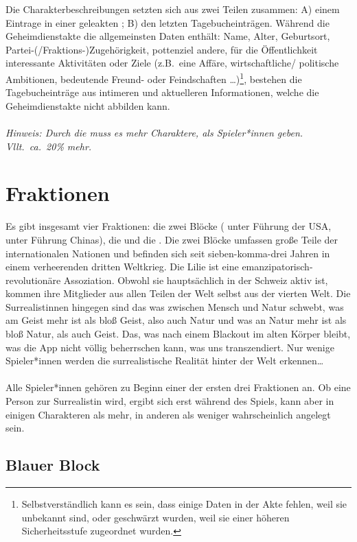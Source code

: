 Die Charakterbeschreibungen setzten sich aus zwei Teilen zusammen: A) einem
Eintrage in einer geleakten ; B) den letzten
Tagebucheinträgen. 
Während die Geheimdienstakte die allgemeinsten Daten enthält: Name, Alter, 
Geburtsort, Partei-(/Fraktions-)Zugehörigkeit, pottenziel andere, für die
Öffentlichkeit interessante Aktivitäten oder Ziele (z.B.~eine Affäre,
wirtschaftliche/ politische Ambitionen, bedeutende Freund- oder Feindschaften
\dots)\footnote{
  Selbstverständlich kann es sein, dass einige Daten in der Akte fehlen, weil
  sie unbekannt sind, oder geschwärzt wurden, weil sie einer höheren
  Sicherheitsstufe zugeordnet wurden.
}, bestehen die Tagebucheinträge aus intimeren und aktuelleren
Informationen, welche die Geheimdienstakte nicht abbilden kann.\\\\
%
\emph{Hinweis: Durch die  muss es mehr Charaktere, als
Spieler*innen geben. Vllt.~ca.~20\% mehr.}

\section{Fraktionen}\label{sec:fraktionen}
Es gibt insgesamt vier Fraktionen: die zwei Blöcke ( unter
Führung der USA,  unter Führung Chinas), die
 und die .
Die zwei Blöcke umfassen große Teile der internationalen Nationen und befinden
sich seit sieben-komma-drei Jahren in einem verheerenden dritten Weltkrieg.
Die Lilie ist eine emanzipatorisch-revolutionäre Assoziation. Obwohl sie
hauptsächlich in der Schweiz aktiv ist, kommen ihre Mitglieder aus allen Teilen
der Welt selbst aus der vierten Welt.
Die Surrealistinnen hingegen sind das was zwischen Mensch und Natur schwebt, was
am Geist mehr ist als bloß Geist, also auch Natur und was an Natur mehr ist als
bloß Natur, als auch Geist. Das, was nach einem Blackout im alten Körper bleibt,
was die App nicht völlig beherrschen kann, was uns transzendiert. 
Nur wenige Spieler*innen werden die surrealistische Realität hinter der Welt
erkennen\dots\\\\
%
Alle Spieler*innen gehören zu Beginn einer der ersten drei Fraktionen an. Ob
eine Person zur Surrealistin wird, ergibt sich erst während des Spiels, kann
aber in einigen Charakteren als mehr, in anderen als weniger wahrscheinlich
angelegt sein.

\subsection{Blauer Block}\label{ssec:blauer_block}

